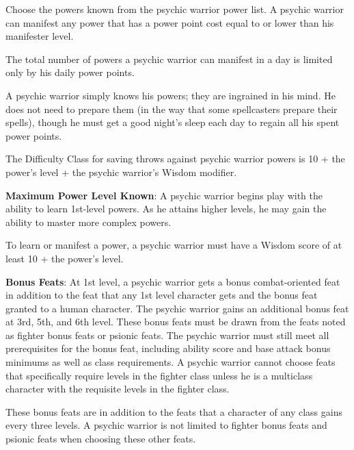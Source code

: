 Choose the powers known from the psychic warrior power list. A psychic warrior can manifest any power that has a power point cost equal to or lower than his manifester level.

The total number of powers a psychic warrior can manifest in a day is limited only by his daily power points.

A psychic warrior simply knows his powers; they are ingrained in his mind. He does not need to prepare them (in the way that some spellcasters prepare their spells), though he must get a good night’s sleep each day to regain all his spent power points.

The Difficulty Class for saving throws against psychic warrior powers is 10 + the power’s level + the psychic warrior’s Wisdom modifier.

\textbf{Maximum Power Level Known}: A psychic warrior begins play with the ability to learn 1st-level powers. As he attains higher levels, he may gain the ability to master more complex powers.

To learn or manifest a power, a psychic warrior must have a Wisdom score of at least 10 + the power’s level.

\textbf{Bonus Feats}: At 1st level, a psychic warrior gets a bonus combat-oriented feat in addition to the feat that any 1st level character gets and the bonus feat granted to a human character. The psychic warrior gains an additional bonus feat at 3rd, 5th, and 6th level. These bonus feats must be drawn from the feats noted as fighter bonus feats or psionic feats. The psychic warrior must still meet all prerequisites for the bonus feat, including ability score and base attack bonus minimums as well as class requirements. A psychic warrior cannot choose feats that specifically require levels in the fighter class unless he is a multiclass character with the requisite levels in the fighter class.

These bonus feats are in addition to the feats that a character of any class gains every three levels. A psychic warrior is not limited to fighter bonus feats and psionic feats when choosing these other feats.